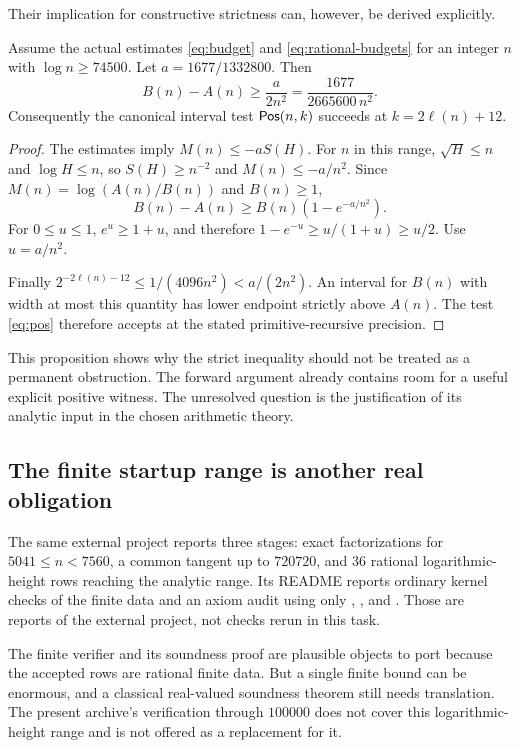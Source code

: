 Their implication for constructive strictness can, however, be derived
explicitly.

\begin{proposition}\label{prop:separation}
Assume the actual estimates \eqref{eq:budget} and
\eqref{eq:rational-budgets} for an integer $n$ with $\log n\ge74500$.
Let $a=1677/1332800$. Then
\[
 B(n)-A(n)\ge\frac{a}{2n^2}
             =\frac{1677}{2665600\,n^2}.
\]
Consequently the canonical interval test $\mathsf{Pos}(n,k)$ succeeds at
$k=2\ell(n)+12$.
\end{proposition}
\begin{proof}
The estimates imply $M(n)\le-aS(H)$.
For $n$ in this range, $\sqrt H\le n$ and $\log H\le n$, so
$S(H)\ge n^{-2}$ and $M(n)\le-a/n^2$.
Since $M(n)=\log(A(n)/B(n))$ and $B(n)\ge1$,
\[
 B(n)-A(n)\ge B(n)(1-e^{-a/n^2}).
\]
For $0\le u\le1$, $e^u\ge1+u$, and therefore
$1-e^{-u}\ge u/(1+u)\ge u/2$. Use $u=a/n^2$.

Finally $2^{-2\ell(n)-12}\le1/(4096n^2)<a/(2n^2)$.
An interval for $B(n)$ with width at most this quantity has lower
endpoint strictly above $A(n)$. The test \eqref{eq:pos} therefore
accepts at the stated primitive-recursive precision.
\end{proof}

This proposition shows why the strict inequality should not be treated
as a permanent obstruction. The forward argument already contains
room for a useful explicit positive witness. The unresolved question
is the justification of its analytic input in the chosen arithmetic
theory.

\subsection{The finite startup range is another real obligation}

The same external project reports three stages: exact factorizations
for $5041\le n<7560$, a common tangent up to $720720$, and $36$
rational logarithmic-height rows reaching the analytic range.
Its README reports ordinary kernel checks of the finite data and an
axiom audit using only , , and
. Those are reports of the external project, not
checks rerun in this task.

The finite verifier and its soundness proof are plausible objects to
port because the accepted rows are rational finite data. But a
single finite bound can be enormous, and a classical real-valued
soundness theorem still needs translation. The present archive's
verification through $100000$ does not cover this logarithmic-height
range and is not offered as a replacement for it.

